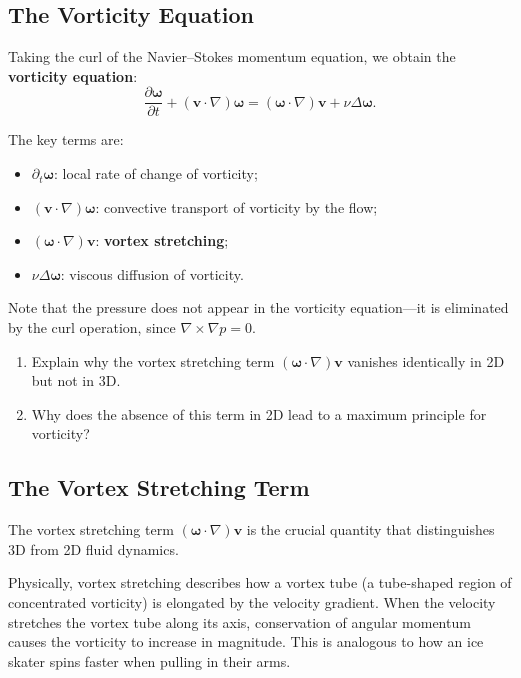 \subsection{The Vorticity Equation}

Taking the curl of the Navier--Stokes momentum equation, we obtain the \textbf{vorticity equation}:
\begin{equation}
\label{eq:vorticity}
\frac{\partial \boldsymbol{\omega}}{\partial t} + (\mathbf{v} \cdot \nabla)\boldsymbol{\omega} = (\boldsymbol{\omega} \cdot \nabla)\mathbf{v} + \nu \Delta \boldsymbol{\omega}.
\end{equation}

The key terms are:
\begin{itemize}
\item $\partial_t \boldsymbol{\omega}$: local rate of change of vorticity;
\item $(\mathbf{v} \cdot \nabla)\boldsymbol{\omega}$: convective transport of vorticity by the flow;
\item $(\boldsymbol{\omega} \cdot \nabla)\mathbf{v}$: \textbf{vortex stretching};
\item $\nu \Delta \boldsymbol{\omega}$: viscous diffusion of vorticity.
\end{itemize}

Note that the pressure does not appear in the vorticity equation---it is eliminated by the curl operation, since $\nabla \times \nabla p = 0$.

\begin{checkyou}
\begin{enumerate}
\item Explain why the vortex stretching term $(\boldsymbol{\omega} \cdot \nabla)\mathbf{v}$ vanishes identically in 2D but not in 3D.
\item Why does the absence of this term in 2D lead to a maximum principle for vorticity?
\end{enumerate}
\end{checkyou}

\subsection{The Vortex Stretching Term}

The vortex stretching term $(\boldsymbol{\omega} \cdot \nabla)\mathbf{v}$ is the crucial quantity that distinguishes 3D from 2D fluid dynamics.

Physically, vortex stretching describes how a vortex tube (a tube-shaped region of concentrated vorticity) is elongated by the velocity gradient. When the velocity stretches the vortex tube along its axis, conservation of angular momentum causes the vorticity to increase in magnitude. This is analogous to how an ice skater spins faster when pulling in their arms.

